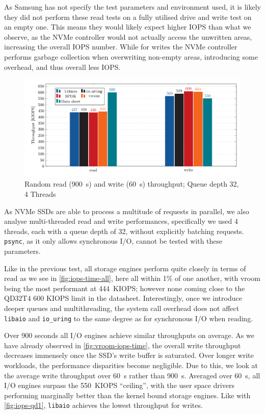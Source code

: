 As Samsung has not specify the test parameters and environment used, it is likely they did not perform these read tests on a fully utilised drive and write test on an empty one. This means they would likely expect higher IOPS than what we observe, as the NVMe controller would not actually access the unwritten areas, increasing the overall IOPS number. While for writes the NVMe controller performs garbage collection when overwriting non-empty areas, introducing some overhead, and thus overall less IOPS.


\begin{figure}
  \centering
    \includegraphics[width=\textwidth]{figures/iops-qd32-ybar}
    \caption{Random read (\qty{900}{\second}) and write (\qty{60}{\second}) throughput; Queue depth 32, 4 Threads}
    \label{fig:iops-qd32}
\end{figure}

As NVMe SSDs are able to process a multitude of requests in parallel, we also analyse multi-threaded read and write performances, specifically we used 4 threads, each with a queue depth of 32, without explicitly batching requests. \texttt{psync}, as it only allows synchronous I/O, cannot be tested with these parameters.

Like in the previous test, all storage engines perform quite closely in terms of read as we see in \autoref{fig:iops-time-all}, here all within 1\% of one another, with vroom being the most performant at \qty{444}{KIOPS}; however none coming close to the QD32T4 600 KIOPS limit in the datasheet. Interestingly, once we introduce deeper queues and multithreading, the system call overhead does not affect \texttt{libaio} and \texttt{io\_uring} to the same degree as for synchronous I/O when reading.

Over 900 seconds all I/O engines achieve similar throughputs on average. As we have already observed in \autoref{fig:vroom-iops-time}, the overall write throughput decreases immensely once the SSD's write buffer is saturated. Over longer write workloads, the performance disparities become negligible. Due to this, we look at the average write throughput over \qty{60}{\second} rather than \qty{900}{\second}. Averaged over \qty{60}{\second}, all I/O engines surpass the \qty{550}{KIOPS} ``ceiling'', with the user space drivers performing marginally better than the kernel bound storage engines. Like with \autoref{fig:iops-qd1}, \texttt{libaio} achieves the lowest throughput for writes.

